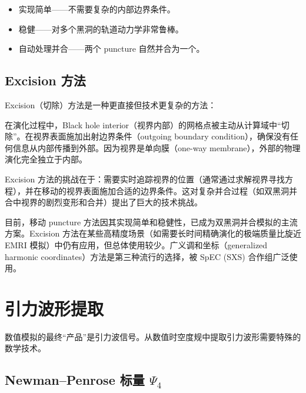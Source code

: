 \begin{property}
    \begin{itemize}
        \item 实现简单——不需要复杂的内部边界条件。
        \item 稳健——对多个黑洞的轨道动力学非常鲁棒。
        \item 自动处理并合——两个 puncture 自然并合为一个。
    \end{itemize}
\end{property}

\subsection{Excision 方法}

Excision（切除）方法是一种更直接但技术更复杂的方法：

\begin{definition}[Excision]
在演化过程中，Black hole interior（视界内部）的网格点被主动从计算域中“切除”。在视界表面施加出射边界条件（outgoing boundary condition），确保没有任何信息从内部传播到外部。因为视界是单向膜（one-way membrane），外部的物理演化完全独立于内部。
\label{def:excision}
\end{definition}

Excision 方法的挑战在于：需要实时追踪视界的位置（通常通过求解视界寻找方程），并在移动的视界表面施加合适的边界条件。这对复杂并合过程（如双黑洞并合中视界的剧烈变形和合并）提出了巨大的技术挑战。

\begin{note}[两种方法的现状]
    目前，移动 puncture 方法因其实现简单和稳健性，已成为双黑洞并合模拟的主流方案。Excision 方法在某些高精度场景（如需要长时间精确演化的极端质量比旋近 EMRI 模拟）中仍有应用，但总体使用较少。广义调和坐标（generalized harmonic coordinates）方法是第三种流行的选择，被 SpEC (SXS) 合作组广泛使用。
\end{note}

\section{引力波形提取}
\label{sec:waveform_extraction}

数值模拟的最终“产品”是引力波信号。从数值时空度规中提取引力波形需要特殊的数学技术。

\subsection{Newman--Penrose 标量 $\Psi_4$}

